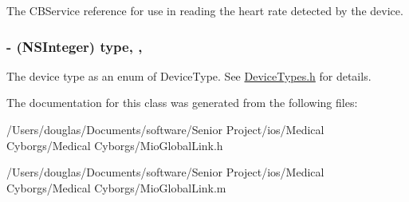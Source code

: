 The C\-B\-Service reference for use in reading the heart rate detected by the device. \hypertarget{interface_mio_global_link_a82edb3dd6e24af3fb2ed9061e2c2b21f}{
\subsubsection[{type}]{\setlength{\rightskip}{0pt plus 5cm}-\/ (N\-S\-Integer) type\hspace{0.3cm}{\ttfamily [read]}, {\ttfamily [write]}, {\ttfamily [atomic]}}}\label{interface_mio_global_link_a82edb3dd6e24af3fb2ed9061e2c2b21f}
The device type as an enum of Device\-Type. See \hyperlink{_device_types_8h_source}{Device\-Types.\-h} for details. 

The documentation for this class was generated from the following files\-:\begin{DoxyCompactItemize}
\item 
/\-Users/douglas/\-Documents/software/\-Senior Project/ios/\-Medical Cyborgs/\-Medical Cyborgs/Mio\-Global\-Link.\-h\item 
/\-Users/douglas/\-Documents/software/\-Senior Project/ios/\-Medical Cyborgs/\-Medical Cyborgs/Mio\-Global\-Link.\-m\end{DoxyCompactItemize}
